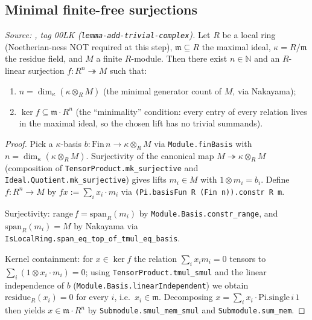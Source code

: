 \subsection{Minimal finite-free surjections}
\label{mk-subsec:ab_gap1_first_step}
\begin{lemma}\label{mk-lem:exists_minimalSurjection_finite_localRing}
  \leanok

  \textit{Source: \cite{stacks-project}, tag 00LK
    (\texttt{lemma-add-trivial-complex}).}
  Let \(R\) be a local ring (Noetherian-ness NOT required at this
  step), \(\mathfrak m \subseteq R\) the maximal ideal,
  \(\kappa = R/\mathfrak m\) the residue field, and \(M\) a finite
  \(R\)-module. Then there exist \(n \in \mathbb N\) and an
  \(R\)-linear surjection \(f : R^n \twoheadrightarrow M\) such that:
  \begin{enumerate}
    \item \(n = \dim_\kappa(\kappa \otimes_R M)\) (the minimal
      generator count of \(M\), via Nakayama);
    \item \(\ker f \subseteq \mathfrak m \cdot R^n\) (the
      ``minimality'' condition: every entry of every relation lives
      in the maximal ideal, so the chosen lift has no trivial
      summands).
  \end{enumerate}
\end{lemma}
\begin{proof}
  \leanok

Pick a \(\kappa\)-basis
  \(b : \mathrm{Fin}\,n \to \kappa \otimes_R M\) via
  \texttt{Module.finBasis} with
  \(n = \dim_\kappa(\kappa \otimes_R M)\). Surjectivity of the
  canonical map \(M \twoheadrightarrow \kappa \otimes_R M\)
  (composition of \texttt{TensorProduct.mk\_surjective} and
  \texttt{Ideal.Quotient.mk\_surjective}) gives lifts
  \(m_i \in M\) with \(1 \otimes m_i = b_i\). Define
  \(f : R^n \to M\) by \(f x := \sum_i x_i \cdot m_i\) via
  \texttt{(Pi.basisFun R (Fin n)).constr R m}.

  Surjectivity: \(\mathrm{range}\, f = \mathrm{span}_R(m_i)\) by
  \texttt{Module.Basis.constr\_range}, and
  \(\mathrm{span}_R(m_i) = M\) by Nakayama via
  \texttt{IsLocalRing.span\_eq\_top\_of\_tmul\_eq\_basis}.

  Kernel containment: for \(x \in \ker f\) the relation
  \(\sum_i x_i m_i = 0\) tensors to
  \(\sum_i (1 \otimes x_i \cdot m_i) = 0\); using
  \texttt{TensorProduct.tmul\_smul} and the linear independence of
  \(b\) (\texttt{Module.Basis.linearIndependent}) we obtain
  \(\mathrm{residue}_R(x_i) = 0\) for every \(i\), i.e.\
  \(x_i \in \mathfrak m\). Decomposing
  \(x = \sum_i x_i \cdot \mathrm{Pi.single}\,i\,1\) then yields
  \(x \in \mathfrak m \cdot R^n\) by
  \texttt{Submodule.smul\_mem\_smul} and
  \texttt{Submodule.sum\_mem}.
\end{proof}

